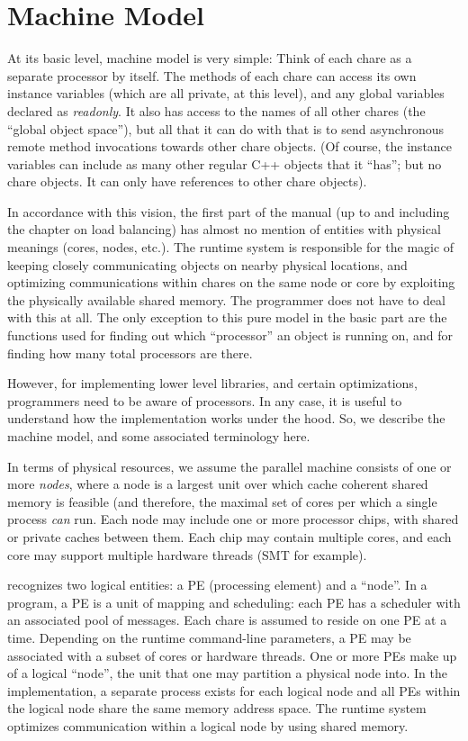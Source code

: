 \section{Machine Model}
\label{machineModel}
\label{sec:machine}
At its basic level, \charmpp{} machine model is very simple: Think of
each chare as a separate processor by itself. The methods of each
chare can access its own instance variables (which are all private, at
this level), and any global variables declared as {\em readonly}. It
also has access to the names of all other chares (the ``global object
space''), but all that it can do with that is to send asynchronous
remote method invocations towards other chare objects. (Of course, the
instance variables can include as many other regular C++ objects that
it ``has''; but no chare objects. It can only have references to other
chare objects).

In accordance with this vision, the first part of the manual (up to
and including the chapter on load balancing) has almost no mention of
entities with physical meanings (cores, nodes, etc.). The runtime
system is responsible for the magic of keeping closely communicating
objects on nearby physical locations, and optimizing communications
within chares on the same node or core by exploiting the physically
available shared memory. The programmer does not have to deal with
this at all. The only exception to this pure model in the basic part
are the functions used for finding out which ``processor'' an object
is running on, and for finding how many total processors are there.

However, for implementing lower level libraries, and certain optimizations,
programmers need to be aware of processors. In any case, it is useful
to understand how the \charmpp{} implementation works under the hood. So,
we describe the machine model, and some associated terminology here.

In terms of physical resources, we assume the parallel machine
consists of one or more {\em nodes}, where a node is a largest unit
over which cache coherent shared memory is feasible (and therefore,
the maximal set of cores per which a single process {\em can} run.
Each node may include one or more processor chips, with shared or
private caches between them. Each chip may contain multiple cores, and
each core may support multiple hardware threads (SMT for example).

\charmpp{} recognizes two logical entities: a PE (processing element) and 
a ``node''.   In a \charmpp{} program, a PE is a
unit of mapping and scheduling: each PE has a scheduler with an
associated pool of messages. Each chare is assumed to reside on one PE
at a time. Depending on the runtime command-line parameters, a PE may
be associated with a subset of cores or hardware threads. One or more PEs
make up of a logical ``node'', the unit that one may partition a physical node
into. In the implementation, a separate
process exists for each logical node and all PEs within the logical node share
the same memory address space. The \charmpp{} runtime system optimizes
communication within a logical node by using shared memory. 

